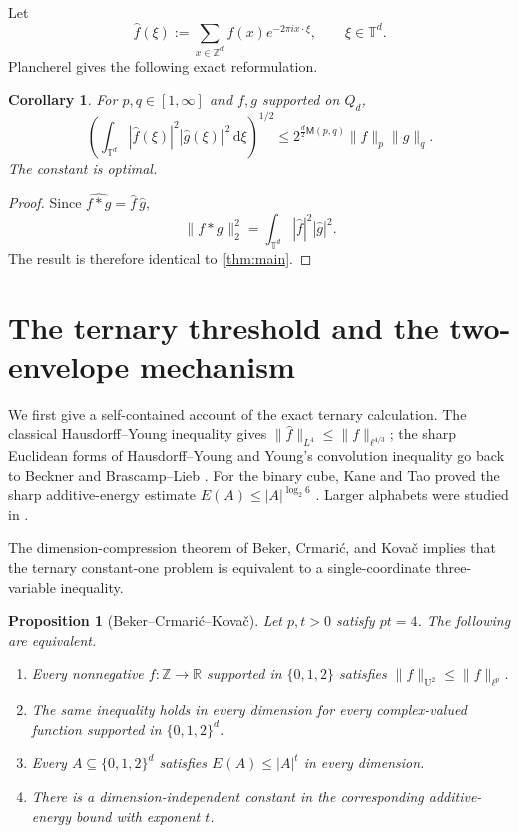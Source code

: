 \documentclass[11pt,reqno]{amsart}
\numberwithin{equation}{section}
\newtheorem{proposition}[proposition]{Proposition}
\newtheorem{corollary}[corollary]{Corollary}
\theoremstyle{definition}
\theoremstyle{remark}
\newcommand{\R}{\mathbb R}
\newcommand{\Z}{\mathbb Z}
\newcommand{\T}{\mathbb T}
\newcommand{\dd}{\,\mathrm d}
\newcommand{\Utwo}{\mathrm U^2}
\newcommand{\norm}[1]{\lVert #1\rVert}
\newcommand{\Mu}{\mathsf M}
\begin{document}
Let
\[
  \widehat f(\xi)
  :=\sum_{x\in\Z^d}f(x)e^{-2\pi i x\cdot\xi},
  \qquad \xi\in\T^d.
\]
Plancherel gives the following exact reformulation.

\begin{corollary}\label{cor:fourier}
For $p,q\in[1,\infty]$ and $f,g$ supported on $Q_d$,
\begin{equation}\label{eq:fourier-overlap}
  \left(
    \int_{\T^d}|\widehat f(\xi)|^2|\widehat g(\xi)|^2\dd\xi
  \right)^{1/2}
  \le
  2^{\frac d2\Mu(p,q)}\|f\|_p\|g\|_q.
\end{equation}
The constant is optimal.
\end{corollary}

\begin{proof}
Since $\widehat{f*g}=\widehat f\,\widehat g$,
\[
  \|f*g\|_2^2
  =\int_{\T^d}|\widehat f|^2|\widehat g|^2.
\]
The result is therefore identical to \cref{thm:main}.
\end{proof}

\section{The ternary threshold and the two-envelope mechanism}

We first give a self-contained account of the exact ternary calculation.
The classical Hausdorff--Young inequality gives
$\norm{\widehat f}_{L^4}\le\norm f_{\ell^{4/3}}$; the sharp Euclidean
forms of Hausdorff--Young and Young's convolution inequality go back to
Beckner and Brascamp--Lieb \cite{Beckner1975,BrascampLieb1976}.
For the binary cube, Kane and Tao proved the sharp additive-energy estimate
$E(A)\le |A|^{\log_2 6}$ \cite{KaneTao2017}.  Larger alphabets were studied
in \cite{DGIM,Shao2026,BekerCK2024}.

The dimension-compression theorem of Beker, Crmari\'c, and Kova\v{c} implies
that the ternary constant-one problem is equivalent to a single-coordinate
three-variable inequality.

\begin{proposition}[Beker--Crmari\'c--Kova\v{c}]\label{prop:compression}
Let $p,t>0$ satisfy $pt=4$.  The following are equivalent.
\begin{enumerate}[label=\textup{(\roman*)}]
  \item Every nonnegative $f\colon\Z\to\R$ supported in $\{0,1,2\}$ satisfies
  $\norm f_{\Utwo}\le\norm f_{\ell^p}$.
  \item The same inequality holds in every dimension for every complex-valued
  function supported in $\{0,1,2\}^d$.
  \item Every $A\subseteq\{0,1,2\}^d$ satisfies $E(A)\le |A|^t$ in every dimension.
  \item There is a dimension-independent constant in the corresponding
  additive-energy bound with exponent $t$.
\end{enumerate}
\end{proposition}
\end{document}
